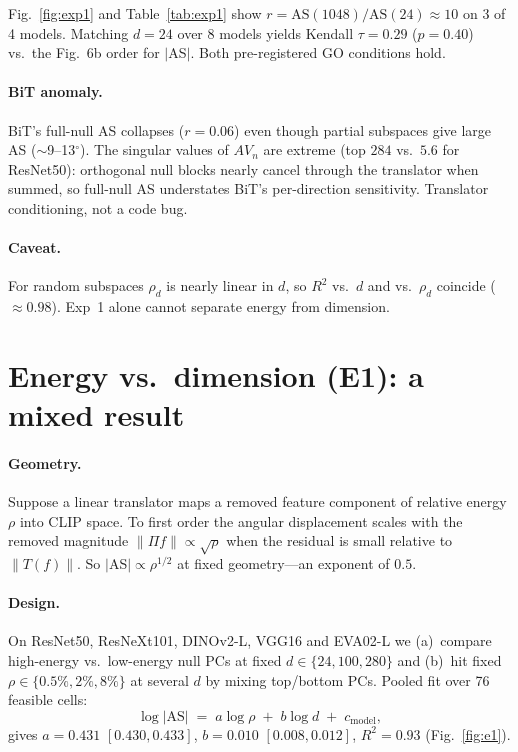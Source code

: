 \documentclass[10pt,twocolumn]{article}
\begin{document}
Fig.~\ref{fig:exp1} and Table~\ref{tab:exp1} show $r{=}\mathrm{AS}(1048)/\mathrm{AS}(24)\approx10$ on 3 of 4 models.
Matching $d{=}24$ over 8 models yields Kendall $\tau{=}0.29$ ($p{=}0.40$) vs.\ the Fig.~6b order for $|$AS$|$.
Both pre-registered GO conditions hold.

\paragraph{BiT anomaly.}
BiT's full-null AS collapses ($r{=}0.06$) even though partial subspaces give large AS ($\sim$9--13$^\circ$).
The singular values of $A V_n$ are extreme (top $284$ vs.\ $5.6$ for ResNet50): orthogonal null blocks nearly cancel through the translator when summed, so full-null AS understates BiT's per-direction sensitivity.
Translator conditioning, not a code bug.

\paragraph{Caveat.}
For random subspaces $\rho_d$ is nearly linear in $d$, so $R^2$ vs.\ $d$ and vs.\ $\rho_d$ coincide ($\approx0.98$).
Exp~1 alone cannot separate energy from dimension.

\section{Energy vs.\ dimension (E1): a mixed result}
\vspace{-0.2em}
\paragraph{Geometry.}
Suppose a linear translator maps a removed feature component of relative energy $\rho$ into CLIP space. To first order the angular displacement scales with the removed magnitude $\|\Pi f\|\propto\sqrt{\rho}$ when the residual is small relative to $\|T(f)\|$.
So $|$AS$|\propto\rho^{1/2}$ at fixed geometry---an exponent of $0.5$.

\paragraph{Design.}
On ResNet50, ResNeXt101, DINOv2-L, VGG16 and EVA02-L we (a)~compare high-energy vs.\ low-energy null PCs at fixed $d\in\{24,100,280\}$ and (b)~hit fixed $\rho\in\{0.5\%,2\%,8\%\}$ at several $d$ by mixing top/bottom PCs.
Pooled fit over 76 feasible cells:
\[
\log|\mathrm{AS}| \;=\; a\log\rho \;+\; b\log d \;+\; c_{\mathrm{model}},
\]
gives $a{=}0.431$ $[0.430,0.433]$, $b{=}0.010$ $[0.008,0.012]$, $R^2{=}0.93$ (Fig.~\ref{fig:e1}).
\end{document}
